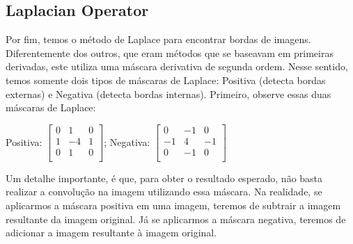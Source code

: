 \documentclass[a4paper, 12pt]{article}
\begin{document}
\subsection{Laplacian Operator}
Por fim, temos o método de Laplace para encontrar bordas de imagens. Diferentemente dos outros, que eram métodos que se baseavam em primeiras derivadas, 
este utiliza uma máscara derivativa de segunda ordem. Nesse sentido, temos somente dois tipos de máscaras de Laplace: Positiva (detecta bordas externas) e 
Negativa (detecta bordas internas).
Primeiro, observe essas duas máscaras de Laplace:
\begin{center}
	Positiva:
	$
	\begin{bmatrix}
		0 &  1  & 0 \\
		1 & -4 & 1 \\
		0 &  1  & 0 \\
	\end{bmatrix}
	$;
	Negativa:
	$
	\begin{bmatrix}
	    0 &  -1  &   0 \\
	   -1 &   4  &  -1 \\
		0 &  -1  &   0 \\
	\end{bmatrix}
	$
\end{center}
Um detalhe importante, é que, para obter o resultado esperado, não basta realizar a convolução na imagem utilizando essa máscara. Na realidade, 
se aplicarmos a máscara positiva em uma imagem, teremos de subtrair a imagem resultante da imagem original. Já se aplicarmos a máscara negativa, 
teremos de adicionar a imagem resultante à imagem original.
\end{document}
